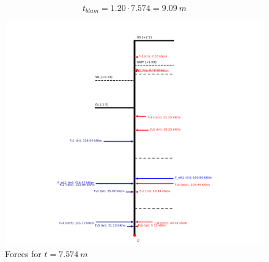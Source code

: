 \begin{equation}
    t_{blum} = 1.20 \cdot 7.574 = 9.09 \ m
\end{equation}

\begin{figure}[H]
    \centering
    \includegraphics[width=0.90\linewidth]{figures/ch8/moment_balance_7574.png}
    \caption{Forces for $t = 7.574 \ m$}
    \label{fig:final_moments_balance}
\end{figure}


